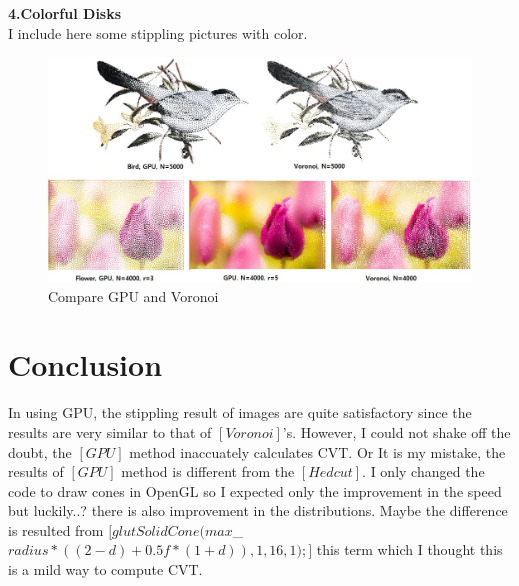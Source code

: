 \documentclass[11pt]{article}
\begin{document}
\textbf{4.Colorful Disks}\\
I include here some stippling pictures with color.
\begin{figure}[ht]
  \includegraphics[width=160mm]{compare3(col).jpg}
  \caption{Compare GPU and Voronoi}\label{compare1h}
\end{figure}

\section{Conclusion}
In using GPU, the stippling result of images are quite satisfactory since the results are very similar to that of $[Voronoi]$'s. However, I could not shake off the doubt, the $[GPU]$ method inaccuately calculates CVT. Or It is my mistake, the results of $[GPU]$ method is different from the $[Hedcut]$. I only changed the code to draw cones in OpenGL so I expected only the improvement in the speed but luckily..? there is also improvement in the distributions. Maybe the difference is resulted from  $[glutSolidCone(max$\_$radius*((2 - d)+0.5f*(1+d)), 1, 16, 1);]$ this term which I thought this is a mild way to compute CVT.



\end{document}
